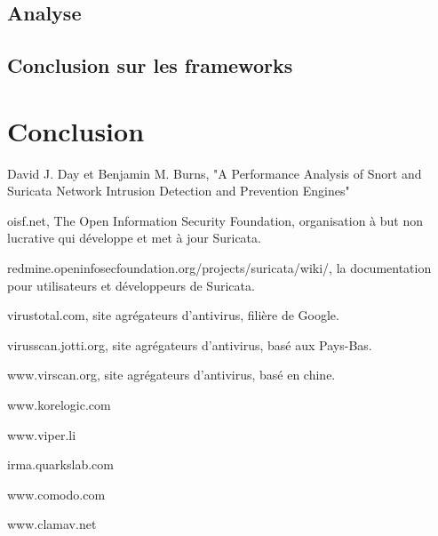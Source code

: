 \documentclass[smallextended]{svjour3}       %
\begin{document}
\subsection{Analyse}
\label{av:analyse}

\subsection{Conclusion sur les frameworks}
\label{av:conclusion}



\newpage
\section{Conclusion}
\label{sec5:conclusion}



\newpage
\begin{thebibliography}{}
%

David J. Day et Benjamin M. Burns, "A Performance Analysis of Snort and Suricata Network Intrusion Detection and Prevention Engines"

oisf.net, The Open Information Security Foundation, organisation à but non lucrative qui développe et met à jour Suricata.

redmine.openinfosecfoundation.org/projects/suricata/wiki/, la documentation pour utilisateurs et développeurs de Suricata.

virustotal.com, site agrégateurs d'antivirus, filière de Google.

virusscan.jotti.org, site agrégateurs d'antivirus, basé aux Pays-Bas.

www.virscan.org, site agrégateurs d'antivirus, basé en chine.

www.korelogic.com

www.viper.li

irma.quarkslab.com

www.comodo.com

www.clamav.net

%

\end{thebibliography}
\end{document}
